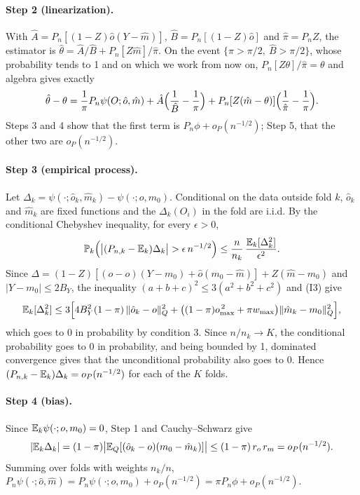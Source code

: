 \paragraph{Step 2 (linearization).} With $\hat A=P_n[(1-Z)\hat o(Y-\hat m)]$, $\hat B=P_n[(1-Z)\hat o]$ and $\hat\pi=P_nZ$, the estimator is $\hat\theta=\hat A/\hat B+P_n[Z\hat m]/\hat\pi$. On the event $\{\hat\pi>\pi/2,\ \hat B>\pi/2\}$, whose probability tends to 1 and on which we work from now on, $P_n[Z\theta]/\hat\pi=\theta$ and algebra gives exactly
\[
\hat\theta-\theta=\frac1\pi P_n\psi(O;\hat o,\hat m)+\hat A\Bigl(\frac1{\hat B}-\frac1\pi\Bigr)+P_n[Z(\hat m-\theta)]\Bigl(\frac1{\hat\pi}-\frac1\pi\Bigr).
\]
Steps 3 and 4 show that the first term is $P_n\phi+o_P(n^{-1/2})$; Step 5, that the other two are $o_P(n^{-1/2})$.

\paragraph{Step 3 (empirical process).} Let $\Delta_k=\psi(\cdot;\hat o_k,\hat m_k)-\psi(\cdot;o,m_0)$. Conditional on the data outside fold $k$, $\hat o_k$ and $\hat m_k$ are fixed functions and the $\Delta_k(O_i)$ in the fold are i.i.d. By the conditional Chebyshev inequality, for every $\epsilon>0$,
\[
\PP_k\Bigl(\bigl|(P_{n,k}-\E_k)\Delta_k\bigr|>\epsilon\,n^{-1/2}\Bigr)\le\frac{n}{n_k}\,\frac{\E_k[\Delta_k^2]}{\epsilon^2}.
\]
Since $\Delta=(1-Z)[(\hat o-o)(Y-m_0)+\hat o(m_0-\hat m)]+Z(\hat m-m_0)$ and $|Y-m_0|\le2B_Y$, the inequality $(a+b+c)^2\le3(a^2+b^2+c^2)$ and (I3) give
\[
\mathbb{E}_k[\Delta_k^2]\le3\Bigl[4B_Y^2(1-\pi)\,\|\hat o_k-o\|_Q^2+\bigl((1-\pi)o_{\max}^{\,2}+\pi w_{\max}\bigr)\|\hat m_k-m_0\|_Q^2\Bigr],
\]
which goes to 0 in probability by condition 3. Since $n/n_k\to K$, the conditional probability goes to 0 in probability, and being bounded by 1, dominated convergence gives that the unconditional probability also goes to 0. Hence $(P_{n,k}-\mathbb{E}_k)\Delta_k=o_P(n^{-1/2})$ for each of the $K$ folds.

\paragraph{Step 4 (bias).} Since $\mathbb{E}_k\psi(\cdot;o,m_0)=0$, Step 1 and Cauchy--Schwarz give
\[
|\mathbb{E}_k\Delta_k|=(1-\pi)\bigl|\mathbb{E}_Q[(\hat o_k-o)(m_0-\hat m_k)]\bigr|\le(1-\pi)\,r_o\,r_m=o_P(n^{-1/2}).
\]
Summing over folds with weights $n_k/n$, $P_n\psi(\cdot;\hat o,\hat m)=P_n\psi(\cdot;o,m_0)+o_P(n^{-1/2})=\pi P_n\phi+o_P(n^{-1/2})$.


